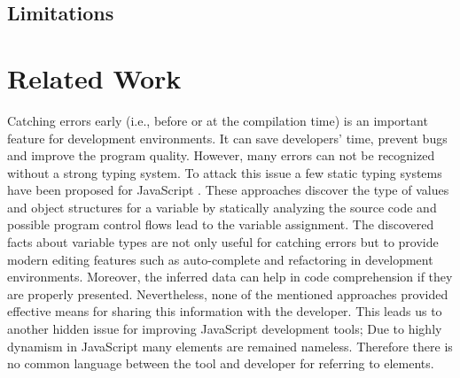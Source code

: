 \documentclass[10pt, preprint]{sigplanconf}
\begin{document}
{\subsection{Limitations}

\section{Related Work}



Catching errors early (i.e., before or at the compilation time) is an important feature for development environments. It can save developers' time, prevent bugs and improve the program quality. However, many errors can not be recognized without a strong typing system. To attack this issue a few static typing systems have been proposed for JavaScript \cite{Anderson, Anderson2, Heidegger, Thiemann}. These approaches discover the type of values and object structures for a variable by statically analyzing the source code and possible program control flows lead to the variable assignment. The discovered facts about variable types are not only useful for catching errors but to provide modern editing features such as auto-complete and refactoring in development environments. Moreover, the inferred data can help in code comprehension if they are properly presented. Nevertheless, none of the mentioned approaches provided effective means for sharing this information with the developer. This leads us to another hidden issue for improving JavaScript development tools; Due to highly dynamism in JavaScript many elements are remained nameless. Therefore there is no common language between the tool and developer for referring to elements.

}
\end{document}
